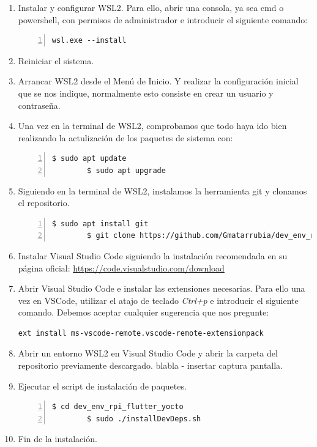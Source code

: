 \begin{enumerate}
    \item Instalar y configurar \gls{WSL2}. Para ello, abrir una consola, ya sea cmd
    o powershell, con permisos de administrador e introducir el siguiente comando:
    \begin{lstlisting}[style=cmd, numbers=left]
        wsl.exe --install
    \end{lstlisting}

    \item Reiniciar el sistema.

    \item Arrancar \gls{WSL2} desde el Menú de Inicio. Y realizar la configuración
    inicial que se nos indique, normalmente esto consiste en crear un usuario y
    contraseña.

    \item Una vez en la terminal de \gls{WSL2}, comprobamos que todo haya ido bien realizando
    la actulización de los paquetes de sistema con:
    \begin{lstlisting}[style=consola, numbers=left]
        $ sudo apt update
        $ sudo apt upgrade
    \end{lstlisting}

    \item Siguiendo en la terminal de \gls{WSL2}, instalamos la herramienta git y clonamos
    el repositorio.
    \begin{lstlisting}[style=consola, numbers=left]
        $ sudo apt install git
        $ git clone https://github.com/Gmatarrubia/dev_env_rpi_flutter_yocto.git
    \end{lstlisting}

    \item Instalar Visual Studio Code siguiendo la instalación recomendada en su página
    oficial: \href{https://code.visualstudio.com/download}{https://code.visualstudio.com/download}

    \item Abrir Visual Studio Code e instalar las extensiones necesarias. Para ello
    una vez en VSCode, utilizar el atajo de teclado \emph{Ctrl+p} e introducir el siguiente
    comando. Debemos aceptar cualquier sugerencia que nos pregunte:
    \begin{lstlisting}[style=cmd]
        ext install ms-vscode-remote.vscode-remote-extensionpack
    \end{lstlisting}

    \item Abrir un entorno \gls{WSL2} en Visual Studio Code y abrir la carpeta del repositorio
    previamente descargado.
    blabla - insertar captura pantalla.

    \item Ejecutar el script de instalación de paquetes.
    \begin{lstlisting}[style=consola, numbers=left]
        $ cd dev_env_rpi_flutter_yocto
        $ sudo ./installDevDeps.sh
    \end{lstlisting}

    \item Fin de la instalación.
\end{enumerate}

